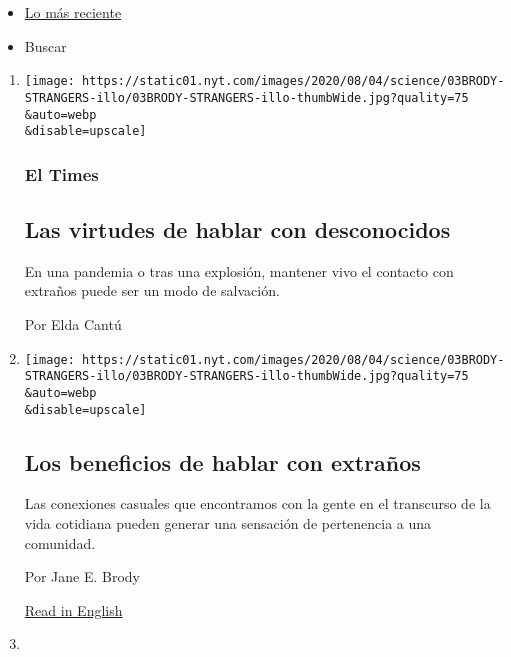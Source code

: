 \begin{itemize}
\tightlist
\item
  \protect\hyperlink{stream-panel}{Lo más reciente}
\item
  Buscar
\end{itemize}

\begin{enumerate}
\def\labelenumi{\arabic{enumi}.}
\item
  \href{/es/2020/08/07/espanol/explosion-libano-coronavirus.html}{}

  \texttt{[image: https://static01.nyt.com/images/2020/08/04/science/03BRODY-STRANGERS-illo/03BRODY-STRANGERS-illo-thumbWide.jpg?quality=75\\\&auto=webp\\\&disable=upscale]}

  \hypertarget{el-times}{%
  \subsubsection{El Times}\label{el-times}}

  \hypertarget{las-virtudes-de-hablar-con-desconocidos}{%
  \subsection{Las virtudes de hablar con
  desconocidos}\label{las-virtudes-de-hablar-con-desconocidos}}

  En una pandemia o tras una explosión, mantener vivo el contacto con
  extraños puede ser un modo de salvación.

  Por Elda Cantú
\item
  \href{/es/2020/08/07/espanol/hablar-con-desconocidos.html}{}

  \texttt{[image: https://static01.nyt.com/images/2020/08/04/science/03BRODY-STRANGERS-illo/03BRODY-STRANGERS-illo-thumbWide.jpg?quality=75\\\&auto=webp\\\&disable=upscale]}

  \hypertarget{los-beneficios-de-hablar-con-extrauxf1os}{%
  \subsection{Los beneficios de hablar con
  extraños}\label{los-beneficios-de-hablar-con-extrauxf1os}}

  Las conexiones casuales que encontramos con la gente en el transcurso
  de la vida cotidiana pueden generar una sensación de pertenencia a una
  comunidad.

  Por Jane E. Brody

  \href{https://www.nytimes.com/2020/08/03/well/family/the-benefits-of-talking-to-strangers.html}{Read
  in English}
\item
  \href{/es/2020/08/06/espanol/estilos-de-vida/bodas-coronavirus-contagio.html}{}


\end{enumerate}
